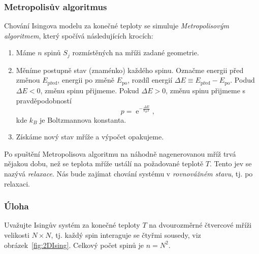 \documentclass[a4paper,11pt,twoside]{article}
\DeclareMathOperator{\e}{e}
\begin{document}
\subsubsection*{Metropolisův algoritmus}
Chování Isingova modelu za konečné teploty se simuluje \emph{Metropolisovým algoritmem}, který spočívá následujících krocích:
\begin{enumerate}
	\item Máme $n$ spinů $S_{j}$ rozmístěných na mříži zadané geometrie.
	\item Měníme postupně stav (znaménko) každého spinu.
		Označme energii před změnou $E_{\mathrm{před}}$, energii po změně $E_{\mathrm{po}}$, rozdíl energií $\Delta E\equiv E_{\mathrm{před}}-E_{\mathrm{po}}$.
		Podud $\Delta E<0$, změnu spinu přijmeme.
		Pokud $\Delta E>0$, změnu spinu přijmeme s pravděpodobností
		\begin{equation}
			p=\e^{-\frac{\Delta E}{k_{B} T}},
		\end{equation}
		kde $k_{B}$ je Boltzmannova konstanta.
	\item Získáme nový stav mříže a výpočet opakujeme.
\end{enumerate}

Po spuštění Metropolisova algoritmu na náhodně nagenerovanou mříž trvá nějakou dobu, než se teplota mříže ustálí na požadované teplotě $T$.
Tento jev se nazývá \emph{relaxace}.
Nás bude zajímat chování systému v \emph{rovnovážném stavu}, tj. po relaxaci.

\subsubsection*{Úloha}
Uvažujte Isingův systém za konečné teploty $T$ na dvourozměrné čtvercové mříži velikosti $N\times N$, tj. každý spin interaguje se čtyřmi sousedy, viz obrázek~\ref{fig:2DIsing}. 
Celkový počet spinů je $n=N^2$.
\end{document}
